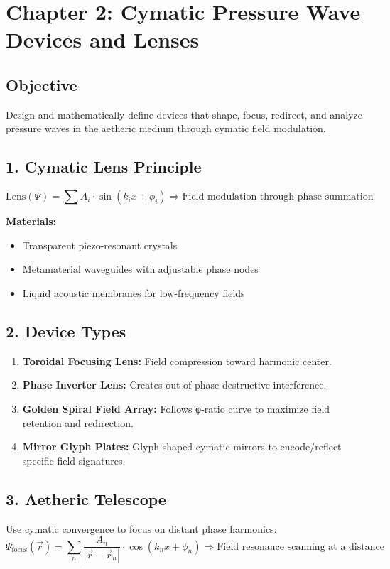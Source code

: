 \documentclass[12pt]{book}
\begin{document}
\section*{Chapter 2: Cymatic Pressure Wave Devices and Lenses}

\subsection*{Objective}
Design and mathematically define devices that shape, focus, redirect, and analyze pressure waves in the aetheric medium through cymatic field modulation.

\subsection*{1. Cymatic Lens Principle}
\[
\text{Lens}(\Psi) = \sum A_i \cdot \sin(k_i x + \phi_i) \Rightarrow \text{Field modulation through phase summation}
\]

\textbf{Materials:}
\begin{itemize}
  \item Transparent piezo-resonant crystals
  \item Metamaterial waveguides with adjustable phase nodes
  \item Liquid acoustic membranes for low-frequency fields
\end{itemize}

\subsection*{2. Device Types}
\begin{enumerate}
  \item \textbf{Toroidal Focusing Lens:} Field compression toward harmonic center.
  \item \textbf{Phase Inverter Lens:} Creates out-of-phase destructive interference.
  \item \textbf{Golden Spiral Field Array:} Follows φ-ratio curve to maximize field retention and redirection.
  \item \textbf{Mirror Glyph Plates:} Glyph-shaped cymatic mirrors to encode/reflect specific field signatures.
\end{enumerate}

\subsection*{3. Aetheric Telescope}
Use cymatic convergence to focus on distant phase harmonics:
\[
\Psi_{\text{focus}}(\vec{r}) = \sum_{n} \frac{A_n}{|\vec{r} - \vec{r}_n|} \cdot \cos(k_n x + \phi_n)
\Rightarrow \text{Field resonance scanning at a distance}
\]
\end{document}
